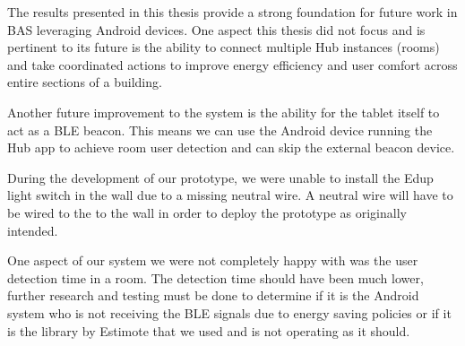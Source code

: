 \documentclass[conference]{IEEEtran}
\begin{document}
The results presented in this thesis provide a strong foundation for future work in \ac{BAS} leveraging Android devices. 
One aspect this thesis did not focus and is pertinent to its future is the ability to connect multiple Hub instances (rooms) and take coordinated actions to improve energy efficiency and user comfort across entire sections of a building. 

Another future improvement to the system is the ability for the tablet itself to act as a \ac{BLE} beacon. This means we can use the Android device running the Hub app to achieve room user detection and can skip the external beacon device.

During the development of our prototype, we were unable to install the Edup light switch in the wall due to a missing neutral wire. A neutral wire will have to be wired to the to the wall in order to deploy the prototype as originally intended. 

One aspect of our system we were not completely happy with was the user detection time in a room. The detection time should have been much lower, further research and testing must be done to determine if it is the Android system who is not receiving the BLE signals due to energy saving policies or if it is the library by Estimote that we used and is not operating as it should.






%
%
%
\end{document}
